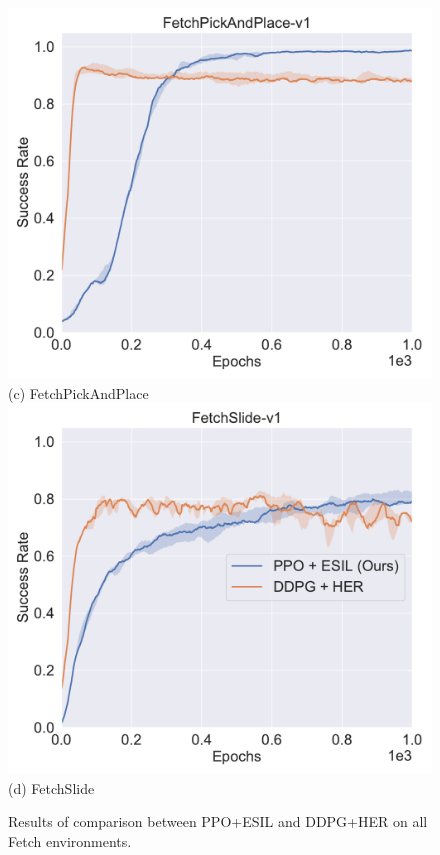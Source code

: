 \begin{figure}[H]
  \includegraphics[width=\linewidth]{figures/chapter3/pick_her.pdf}
  ({c}) FetchPickAndPlace
\endminipage
{}%
  \centering
  \includegraphics[width=\linewidth]{figures/chapter3/slide_her.pdf}
  ({d}) FetchSlide
\endminipage\hfill
\caption{Results of comparison between PPO+ESIL and DDPG+HER on all Fetch environments.}
\label{fig:her_compare}
\end{figure}

